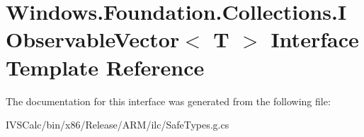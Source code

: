 \hypertarget{interface_windows_1_1_foundation_1_1_collections_1_1_i_observable_vector}{}\section{Windows.\+Foundation.\+Collections.\+I\+Observable\+Vector$<$ T $>$ Interface Template Reference}
\label{interface_windows_1_1_foundation_1_1_collections_1_1_i_observable_vector}


The documentation for this interface was generated from the following file\+:\begin{DoxyCompactItemize}
\item 
I\+V\+S\+Calc/bin/x86/\+Release/\+A\+R\+M/ilc/Safe\+Types.\+g.\+cs\end{DoxyCompactItemize}
